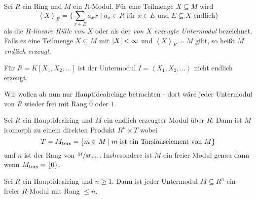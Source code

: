 \begin{definition}
	Sei $R$ ein Ring und $M $ ein $R$-Modul.
	Für eine Teilmenge $X \subseteq M$ wird
	\[
	\left< X \right>_{R} = \{\sum_{x \in E} a_{x} x \mid a_{x} \in R \text{ für $x \in E$ und $E \subseteq X$ endlich}\} 
	\]
	als die \emph{$R$-lineare Hülle von $X$} oder als der \emph{von $X$ erzeugte Untermodul} bezeichnet.
	Falls es eine Teilmenge $X \subseteq M$ mit $\abs{X} < \infty$ und $\left< X \right>_{R} = M$ gibt, so heißt $M$ \emph{endlich erzeugt}.
\end{definition}

\begin{eg}
	Für $R = K[X_1,X_2,\ldots]$ ist der Untermodul $I = \left< X_1,X_2,\ldots \right>$ nicht endlich erzeugt.
\end{eg}

Wir wollen ab nun nur Hauptidealreinge betrachten - dort wäre jeder Untermodul von $R$ wieder frei mit Rang $0$ oder $1$.

\begin{theorem}
	Sei $R$ ein Hauptidealring und $M$ ein endlich erzeugter Modul über $R$.
	Dann ist $M$ isomorph zu einem direkten Produkt $R^{n} \times T$ wobei
	\[
		T = M_{\operatorname{tors}} = \{m \in M \mid m \text{ ist ein Torsionselement von } M\}
	\]
	und $n$ ist der Rang von $\sfrac{M}{M_{\operatorname{tors}}}$.
	Insbesondere ist $M$ ein freier Modul genau dann wenn $M_{\operatorname{tors}} = \{0\}$.
\end{theorem}

\begin{proposition}
	Sei $R$ ein Hauptidealring und $n \geq 1$. Dann ist jeder Untermodul $M \subseteq R^{n}$ ein freier $R$-Modul mit Rang $\leq n$.
\end{proposition}


